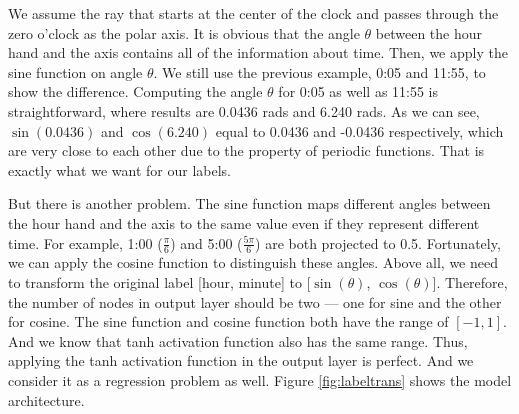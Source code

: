 \documentclass{article}
\begin{document}
We assume the ray that starts at the center of the clock and passes through the zero o'clock as the polar axis. It is obvious that the angle $\theta$ between the hour hand and the axis contains all of the information about time. Then, we apply the sine function on angle $\theta$. We still use the previous example, 0:05 and 11:55, to show the difference. Computing the angle $\theta$ for 0:05 as well as 11:55 is straightforward, where results are 0.0436 rads and 6.240 rads. As we can see, $\sin(0.0436)$ and $\cos(6.240)$ equal to 0.0436 and -0.0436 respectively, which are very close to each other due to the property of periodic functions. That is exactly what we want for our labels.

But there is another problem. The sine function maps different angles between the hour hand and the axis to the same value even if they represent different time. For example, 1:00 ($\frac{\pi}{6}$) and 5:00 ($\frac{5\pi}{6}$) are both projected to 0.5. Fortunately, we can apply the cosine function to distinguish these angles. Above all, we need to transform the original label [hour, minute] to [$\sin(\theta)$, $\cos(\theta)$]. Therefore, the number of nodes in output layer should be two --- one for sine and the other for cosine. The sine function and cosine function both have the range of $[-1,1]$. And we know that tanh activation function also has the same range. Thus, applying the tanh activation function in the output layer is perfect. And we consider it as a regression problem as well. Figure \ref{fig:labeltrans} shows the model architecture.
\end{document}
